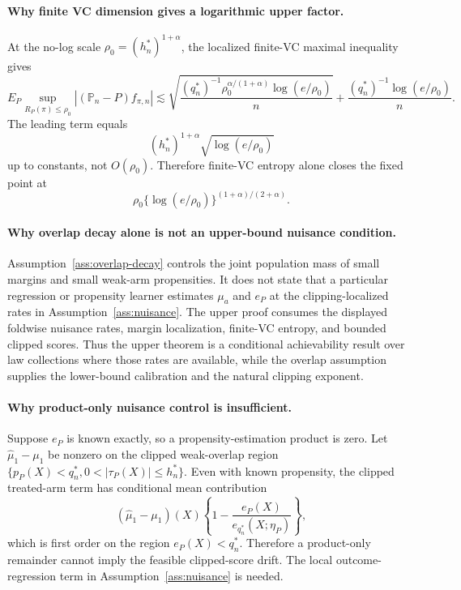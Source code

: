 \documentclass[11pt]{article}
\theoremstyle{definition}
\theoremstyle{plain}
\theoremstyle{remark}
\begin{document}
\paragraph{Why finite VC dimension gives a logarithmic upper factor.}
At the no-log scale \(\rho_0=(h_n^*)^{1+\alpha}\), the localized finite-VC
maximal inequality gives
\[
E_P\sup_{R_P(\pi)\le\rho_0}
|(\mathbb P_n-P)f_{\pi,n}|
\lesssim
\sqrt{\frac{(q_n^*)^{-1}\rho_0^{\alpha/(1+\alpha)}
\log(e/\rho_0)}{n}}
+
\frac{(q_n^*)^{-1}\log(e/\rho_0)}{n}.
\]
The leading term equals
\[
(h_n^*)^{1+\alpha}\sqrt{\log(e/\rho_0)}
\]
up to constants, not \(O(\rho_0)\).  Therefore finite-VC entropy alone closes
the fixed point at
\[
\rho_0\{\log(e/\rho_0)\}^{(1+\alpha)/(2+\alpha)}.
\]

\paragraph{Why overlap decay alone is not an upper-bound nuisance condition.}
Assumption~\ref{ass:overlap-decay} controls the joint population mass of
small margins and small weak-arm propensities.  It does not state that a
particular regression or propensity learner estimates \(\mu_a\) and \(e_P\)
at the clipping-localized rates in Assumption~\ref{ass:nuisance}.  The upper
proof consumes the displayed foldwise nuisance rates, margin localization,
finite-VC entropy, and bounded clipped scores.  Thus the upper theorem is a
conditional achievability result over law collections where those rates are
available, while the overlap assumption supplies the lower-bound calibration
and the natural clipping exponent.

\paragraph{Why product-only nuisance control is insufficient.}
Suppose \(e_P\) is known exactly, so a propensity-estimation product is zero.
Let \(\widehat\mu_1-\mu_1\) be nonzero on the clipped weak-overlap region
\(\{p_P(X)<q_n^*,0<|\tau_P(X)|\le h_n^*\}\).  Even with known propensity, the
clipped treated-arm term has conditional mean contribution
\[
(\widehat\mu_1-\mu_1)(X)
\left\{1-\frac{e_P(X)}{e_{q_n^*}(X;\eta_P)}\right\},
\]
which is first order on the region \(e_P(X)<q_n^*\).  Therefore a
product-only remainder cannot imply the feasible clipped-score drift.  The
local outcome-regression term in Assumption~\ref{ass:nuisance} is needed.
\end{document}
